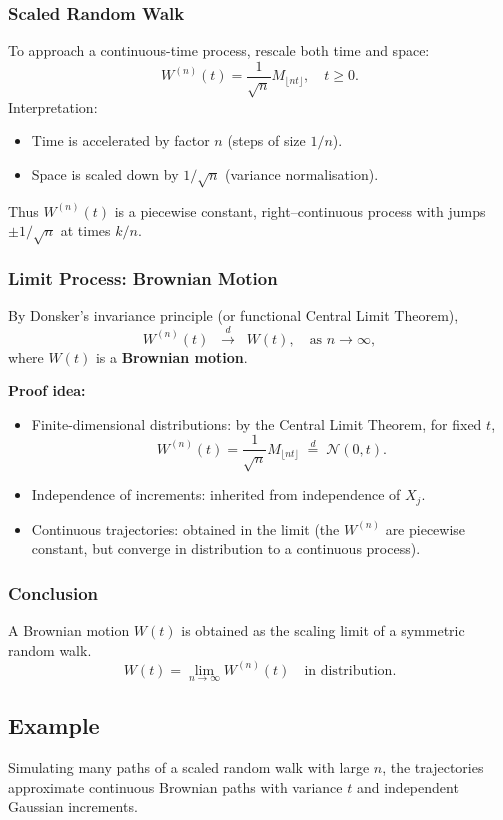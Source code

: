 \documentclass[12pt,a4paper]{book}
\theoremstyle{remark}
\newcommand{\Normal}{\mathcal{N}}
\newcommand{\law}{\stackrel{d}{=}}    %
\begin{document}
\subsubsection*{Scaled Random Walk}
To approach a continuous-time process, rescale both time and space:
\[
W^{(n)}(t) = \frac{1}{\sqrt{n}} M_{\lfloor nt \rfloor}, \quad t \ge 0.
\]
Interpretation:
\begin{itemize}
    \item Time is accelerated by factor $n$ (steps of size $1/n$).
    \item Space is scaled down by $1/\sqrt{n}$ (variance normalisation).
\end{itemize}
Thus $W^{(n)}(t)$ is a piecewise constant, right–continuous process with jumps $\pm 1/\sqrt{n}$ at times $k/n$.

\subsubsection*{Limit Process: Brownian Motion}
By Donsker’s invariance principle (or functional Central Limit Theorem),
\[
W^{(n)}(t) \;\; \xrightarrow{d}\;\; W(t), \quad \text{as } n\to\infty,
\]
where $W(t)$ is a \textbf{Brownian motion}.  

\textbf{Proof idea:}
\begin{itemize}
    \item Finite-dimensional distributions: by the Central Limit Theorem, for fixed $t$, 
    \[
    W^{(n)}(t) = \frac{1}{\sqrt{n}}M_{\lfloor nt \rfloor} \;\law\; \Normal(0,t).
    \]
    \item Independence of increments: inherited from independence of $X_j$.
    \item Continuous trajectories: obtained in the limit (the $W^{(n)}$ are piecewise constant, but converge in distribution to a continuous process).
\end{itemize}

\subsubsection*{Conclusion}
A Brownian motion $W(t)$ is obtained as the scaling limit of a symmetric random walk.  
\[
W(t) = \lim_{n\to\infty} W^{(n)}(t) \quad \text{in distribution}.
\]

\subsection*{Example}
Simulating many paths of a scaled random walk with large $n$, the trajectories approximate continuous Brownian paths with variance $t$ and independent Gaussian increments.
\end{document}
